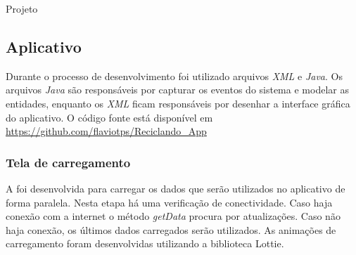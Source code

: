 \documentclass[
	12pt,				%
	openany,			%
	twoside,			%
	a4paper,			%
	english,			%
	french,				%
	spanish,			%
	brazil				%
	]{abntex2}
\begin{document}
\begin{chapter}{Projeto}
\subsection{Aplicativo}
Durante o processo de desenvolvimento foi utilizado arquivos \textit{XML} e \textit{Java}. Os arquivos \textit{Java} são responsáveis por capturar os eventos do sistema e modelar as entidades, enquanto os \textit{XML} ficam responsáveis por desenhar a interface gráfica do aplicativo. O código fonte está disponível em \url{https://github.com/flaviotps/Reciclando_App}

\subsubsection{Tela de carregamento} \label{splash_activity}
A  foi desenvolvida para carregar os dados que serão utilizados no aplicativo de forma paralela. Nesta etapa há uma verificação de conectividade. Caso haja conexão com a internet o método \textit{getData} procura por atualizações. Caso não haja conexão, os últimos dados carregados serão utilizados.
As animações de carregamento foram desenvolvidas utilizando a biblioteca Lottie.




\end{chapter}
\end{document}
